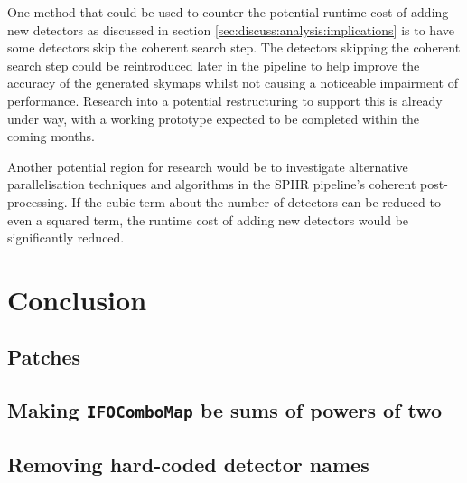 \documentclass{article}
\begin{document}
One method that could be used to counter the potential runtime cost of adding new detectors \textemdash{} as discussed in section \ref{sec:discuss:analysis:implications} \textemdash{} is to have some detectors skip the coherent search step.
The detectors skipping the coherent search step could be reintroduced later in the pipeline to help improve the accuracy of the generated skymaps whilst not causing a noticeable impairment of performance.
Research into a potential restructuring to support this is already under way, with a working prototype expected to be completed within the coming months.

Another potential region for research would be to investigate alternative parallelisation techniques and algorithms in the SPIIR pipeline's coherent post-processing.
If the cubic term about the number of detectors can be reduced to even a squared term, the runtime cost of adding new detectors would be significantly reduced.

\section{Conclusion} \label{sec:conclusion}

\printbibliography[heading=bibintoc]{}

\begin{appendices}
    \section{Patches} \label{app:patches}
    \subsection{Making \texttt{IFOComboMap} be sums of powers of two} \label{app:patches:icombo}
    \linespread{0.3}
    \linespread{1}
    \subsection{Removing hard-coded detector names} \label{app:patches:ndetector}
    \linespread{0.3}
    \linespread{1}
\end{appendices}
\end{document}
